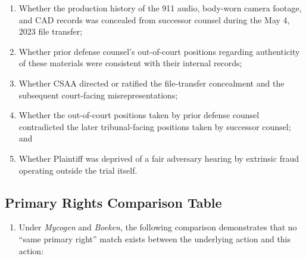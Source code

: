 \begin{enumerate}
\def\labelenumi{(\alph{enumi})}
\item
  Whether the production history of the 911 audio, body-worn camera footage, and CAD records was concealed from successor counsel during the May 4, 2023 file transfer;
\item
  Whether prior defense counsel's out-of-court positions regarding authenticity of these materials were consistent with their internal records;
\item
  Whether CSAA directed or ratified the file-transfer concealment and the subsequent court-facing misrepresentations;
\item
  Whether the out-of-court positions taken by prior defense counsel contradicted the later tribunal-facing positions taken by successor counsel; and
\item
  Whether Plaintiff was deprived of a fair adversary hearing by extrinsic fraud operating outside the trial itself.
\end{enumerate}

\subsection{Primary Rights Comparison Table}\label{primary-rights-comparison-table}

\begin{enumerate}
\def\labelenumi{\arabic{enumi}.}
\setcounter{enumi}{24}
\tightlist
\item
  Under \emph{Mycogen} and \emph{Boeken}, the following comparison demonstrates that no ``same primary right'' match exists between the underlying action and this action:
\end{enumerate}

